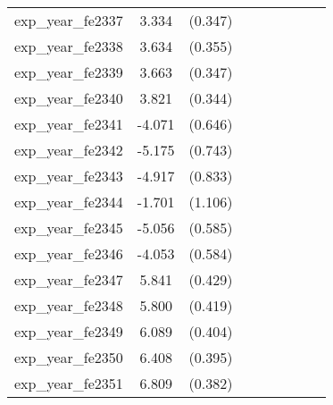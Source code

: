 {\begin{tabular}{l*{4}{cc}}
exp\_year\_fe2337&    3.334\sym{***}&  (0.347)&                  &         &                  &         &                  &         \\
exp\_year\_fe2338&    3.634\sym{***}&  (0.355)&                  &         &                  &         &                  &         \\
exp\_year\_fe2339&    3.663\sym{***}&  (0.347)&                  &         &                  &         &                  &         \\
exp\_year\_fe2340&    3.821\sym{***}&  (0.344)&                  &         &                  &         &                  &         \\
exp\_year\_fe2341&   -4.071\sym{***}&  (0.646)&                  &         &                  &         &                  &         \\
exp\_year\_fe2342&   -5.175\sym{***}&  (0.743)&                  &         &                  &         &                  &         \\
exp\_year\_fe2343&   -4.917\sym{***}&  (0.833)&                  &         &                  &         &                  &         \\
exp\_year\_fe2344&   -1.701         &  (1.106)&                  &         &                  &         &                  &         \\
exp\_year\_fe2345&   -5.056\sym{***}&  (0.585)&                  &         &                  &         &                  &         \\
exp\_year\_fe2346&   -4.053\sym{***}&  (0.584)&                  &         &                  &         &                  &         \\
exp\_year\_fe2347&    5.841\sym{***}&  (0.429)&                  &         &                  &         &                  &         \\
exp\_year\_fe2348&    5.800\sym{***}&  (0.419)&                  &         &                  &         &                  &         \\
exp\_year\_fe2349&    6.089\sym{***}&  (0.404)&                  &         &                  &         &                  &         \\
exp\_year\_fe2350&    6.408\sym{***}&  (0.395)&                  &         &                  &         &                  &         \\
exp\_year\_fe2351&    6.809\sym{***}&  (0.382)&                  &         &                  &         &                  &         \\

\end{tabular}}
